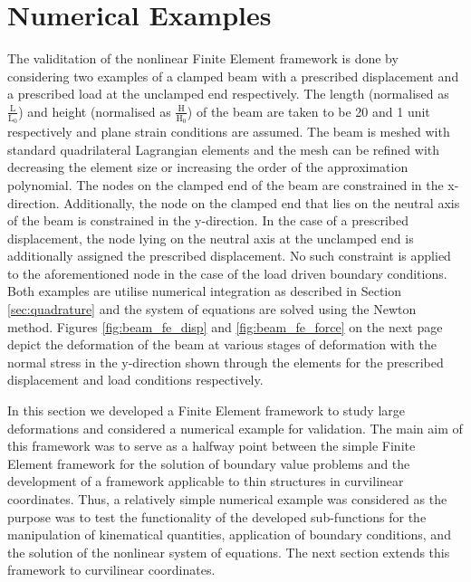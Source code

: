\section{Numerical Examples}
The validitation of the nonlinear Finite Element framework is done by considering two examples of a clamped beam
 with a prescribed displacement and a prescribed load at the unclamped end respectively. The length (normalised as $\frac{\mathrm{L}}{\mathrm{L}_0}$) and height (normalised as $\frac{\mathrm{H}}{\mathrm{H}_0}$) of the beam
 are taken to be 20 and 1 unit respectively and plane strain conditions are assumed. The beam is meshed with
 standard quadrilateral Lagrangian elements and the mesh can be refined with decreasing the element size or increasing the
 order of the approximation polynomial. The nodes on the clamped end of the beam are constrained in the x-direction. Additionally,
 the node on the clamped end that lies on the neutral axis of the beam is constrained in the y-direction. In the case of a prescribed displacement, the node lying on the neutral axis at the unclamped end is additionally assigned the prescribed displacement.
 No such constraint is applied to the aforementioned node in the case of the load driven boundary conditions. Both examples are
 utilise numerical integration as described in Section \ref{sec:quadrature} and the system of equations are solved using the Newton method.
Figures \ref{fig:beam_fe_disp} and \ref{fig:beam_fe_force} on the next page depict the deformation of the beam at various stages of deformation with the normal stress in the y-direction shown through the elements
 for the prescribed displacement and load conditions respectively.

In this section we developed a Finite Element framework to study large deformations and considered a numerical example for validation.
 The main aim of this framework was to serve as a halfway point between the simple Finite Element framework for the solution of boundary
 value problems and the development of a framework applicable to thin structures in curvilinear coordinates. Thus, a relatively
 simple numerical example was considered as the purpose was to test the functionality of the developed sub-functions for the
 manipulation of kinematical quantities, application of boundary conditions, and the solution of the nonlinear system of equations. The
 next section extends this framework to curvilinear coordinates. 

